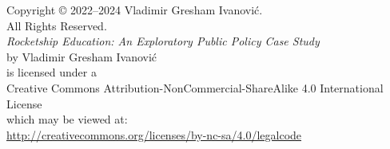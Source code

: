 
\begin{vplace}[1]
\footnotesize
    \begin{center}
        Copyright © 2022–2024 Vladimir Gresham Ivanović.\\
        All Rights Reserved.\\\bigskip\bigskip
        \textit{Rocketship Education: An Exploratory Public Policy Case Study}\\
        by Vladimir Gresham Ivanović\\
        is licensed under a \\
        Creative Commons Attribution-NonCommercial-ShareAlike 4.0 International License\\
        which may be viewed at:\\
        \url{http://creativecommons.org/licenses/by-nc-sa/4.0/legalcode}
    \end{center}
 \end{vplace}
 
